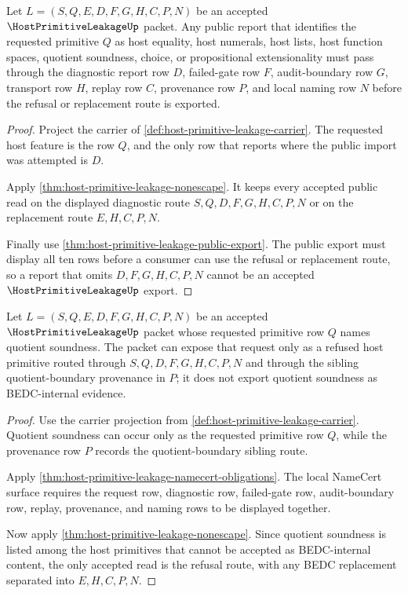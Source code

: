 \begin{theorem}
\label{thm:host-primitive-leakage-report-row-refusal}
Let $L=(S,Q,E,D,F,G,H,C,P,N)$ be an accepted $\HostPrimitiveLeakageUp$ packet. Any public report that identifies the requested primitive $Q$ as host equality, host numerals, host lists, host function spaces, quotient soundness, choice, or propositional extensionality must pass through the diagnostic report row $D$, failed-gate row $F$, audit-boundary row $G$, transport row $H$, replay row $C$, provenance row $P$, and local naming row $N$ before the refusal or replacement route is exported.
\end{theorem}
\begin{proof}
Project the carrier of \autoref{def:host-primitive-leakage-carrier}. The requested host feature is the row $Q$, and the only row that reports where the public import was attempted is $D$.

Apply \autoref{thm:host-primitive-leakage-nonescape}. It keeps every accepted public read on the displayed diagnostic route $S,Q,D,F,G,H,C,P,N$ or on the replacement route $E,H,C,P,N$.

Finally use \autoref{thm:host-primitive-leakage-public-export}. The public export must display all ten rows before a consumer can use the refusal or replacement route, so a report that omits $D,F,G,H,C,P,N$ cannot be an accepted $\HostPrimitiveLeakageUp$ export.
\end{proof}

\begin{theorem}
\label{thm:host-primitive-leakage-quot-soundness-nonescape}
Let $L=(S,Q,E,D,F,G,H,C,P,N)$ be an accepted $\HostPrimitiveLeakageUp$ packet whose requested primitive row $Q$ names quotient soundness. The packet can expose that request only as a refused host primitive routed through $S,Q,D,F,G,H,C,P,N$ and through the sibling quotient-boundary provenance in $P$; it does not export quotient soundness as BEDC-internal evidence.
\end{theorem}
\begin{proof}
Use the carrier projection from \autoref{def:host-primitive-leakage-carrier}. Quotient soundness can occur only as the requested primitive row $Q$, while the provenance row $P$ records the quotient-boundary sibling route.

Apply \autoref{thm:host-primitive-leakage-namecert-obligations}. The local NameCert surface requires the request row, diagnostic row, failed-gate row, audit-boundary row, replay, provenance, and naming rows to be displayed together.

Now apply \autoref{thm:host-primitive-leakage-nonescape}. Since quotient soundness is listed among the host primitives that cannot be accepted as BEDC-internal content, the only accepted read is the refusal route, with any BEDC replacement separated into $E,H,C,P,N$.
\end{proof}

